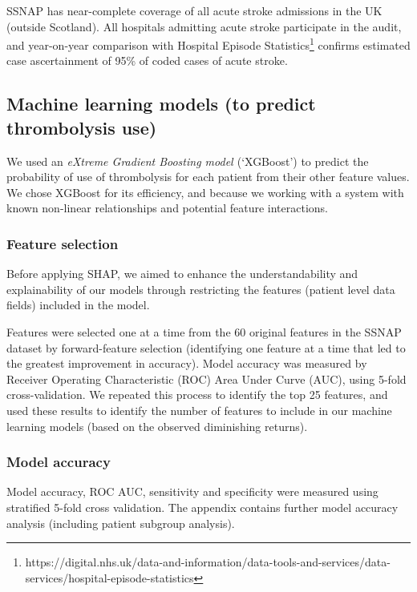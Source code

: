  SSNAP has near-complete coverage of all acute stroke admissions in the UK (outside Scotland). All hospitals admitting acute stroke participate in the audit, and year-on-year comparison with Hospital Episode Statistics\footnote{https://digital.nhs.uk/data-and-information/data-tools-and-services/data-services/hospital-episode-statistics} confirms estimated case ascertainment of 95\% of coded cases of acute stroke.


\subsection{Machine learning models (to predict thrombolysis use)}
We used an \emph{eXtreme Gradient Boosting model \cite{chen_xgboost_2016}} (`XGBoost') to predict the probability of use of thrombolysis for each patient from their other feature values. We chose XGBoost for its efficiency, and because we working with a system with known non-linear relationships and potential feature interactions.


\subsubsection{Feature selection}
Before applying SHAP, we aimed to enhance the understandability and explainability of our models through restricting the features (patient level data fields) included in the model. 

Features were selected one at a time from the 60 original features in the SSNAP dataset by forward-feature selection \cite{ferri_comparative_1994} (identifying one feature at a time that led to the greatest improvement in accuracy). Model accuracy was measured by Receiver Operating Characteristic (ROC) Area Under Curve (AUC), using 5-fold cross-validation. We repeated this process to identify the top 25 features, and used these results to identify the number of features to include in our machine learning models (based on the observed diminishing returns).


\subsubsection{Model accuracy}
Model accuracy, ROC AUC, sensitivity and specificity were measured using stratified 5-fold cross validation. The appendix contains further model accuracy analysis (including patient subgroup analysis).

